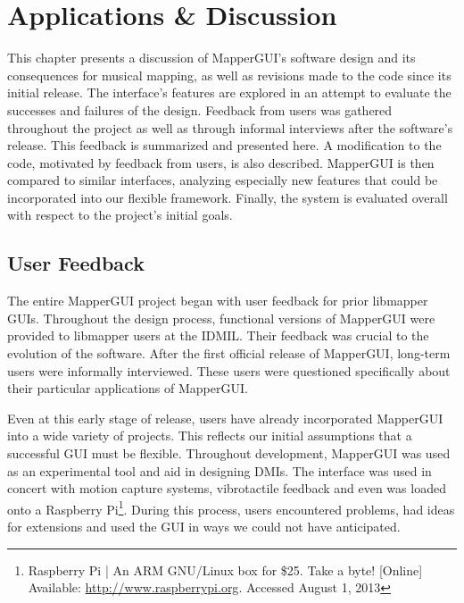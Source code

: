 \chapter{Applications \& Discussion}

This chapter presents a discussion of MapperGUI's software design and its consequences for musical mapping, as well as revisions made to the code since its initial release. The interface's features are explored in an attempt to evaluate the successes and failures of the design. Feedback from users was gathered throughout the project as well as through informal interviews after the software's release. This feedback is summarized and presented here. A modification to the code, motivated by feedback from users, is also described. MapperGUI is then compared to similar interfaces, analyzing especially new features that could be incorporated into our flexible framework. Finally, the system is evaluated overall with respect to the project's initial goals.


\section{User Feedback} %
\label{sec:user_feedback}

The entire MapperGUI project began with user feedback for prior libmapper GUIs. Throughout the design process, functional versions of MapperGUI were provided to libmapper users at the IDMIL. Their feedback was crucial to the evolution of the software. After the first official release of MapperGUI, long-term users were informally interviewed. These users were questioned specifically about their particular applications of MapperGUI.

Even at this early stage of release, users have already incorporated MapperGUI into a wide variety of projects. This reflects our initial assumptions that a successful GUI must be flexible. Throughout development, MapperGUI was used as an experimental tool and aid in designing DMIs. The interface was used in concert with motion capture systems, vibrotactile feedback and even was loaded onto a Raspberry Pi\footnote{Raspberry Pi | An ARM GNU/Linux box for \$25. Take a byte! [Online] Available: \url{http://www.raspberrypi.org}. Accessed August 1, 2013}. During this process, users encountered problems, had ideas for extensions and used the GUI in ways we could not have anticipated.



